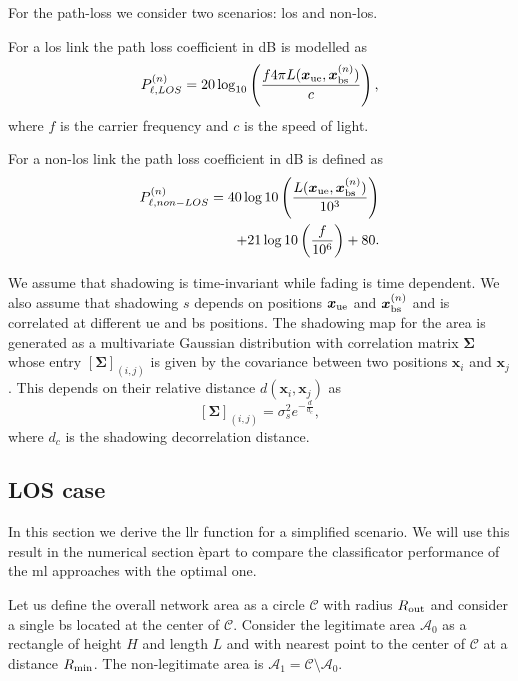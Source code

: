 \documentclass[twocolumns]{IEEEtran}
\begin{document}
For the path-loss we consider two scenarios: \ac{los} and non-\ac{los}.

For a \ac{los} link the path loss coefficient in dB is modelled as
\begin{equation}\label{eq:los}
    P_{\ell,LOS}^{(n)} = 20\log_{10}\left(\frac{f 4\pi L(\bm{x}_{\rm ue},\bm{x}_{\rm bs}^{(n)})}{c}\right),
\end{equation}
where $f$ is the carrier frequency and $c$ is the speed of light.

For a  non-\ac{los} link the path loss coefficient in dB is defined as
\begin{equation}
\begin{split}
    P_{\ell, non-LOS}^{(n)} = 40\log10\left (\frac{L(\bm{x}_{\rm ue},\bm{x}_{\rm bs}^{(n)})}{10^3}\right ) \\
    + 21\log10\left(\frac{f}{10^6}\right) + 80.
    \end{split}
\end{equation}

We assume that shadowing is time-invariant while fading is time dependent. We also assume that shadowing $s$ depends on positions $\bm{x}_{\rm ue}$ and $\bm{x}_{\rm bs}^{(n)}$ and is correlated at different \ac{ue} and \ac{bs} positions. The shadowing map for the area is generated as a multivariate Gaussian distribution with correlation matrix $\bm{\Sigma}$ whose entry $\left[\bm{\Sigma}\right]_{(i,j)}$ is given by the covariance between two positions $\bm{x}_i$ and $\bm{x}_j$. This depends on their relative distance $d(\bm{x}_i,\bm{x}_j)$ as
\begin{equation}\label{eq: coor mat}
    \left[\bm{\Sigma}\right]_{(i,j)} = \sigma_s^2e^{-\frac{d}{d_c}},
\end{equation}
where $d_c$ is the shadowing decorrelation distance. 

\subsection{LOS case}

In this section we derive the \ac{llr} function for a simplified scenario. We will use this result in the numerical section èpart to compare the classificator performance of the \ac{ml} approaches with the optimal one.

Let us define the overall network area as a circle $\mathcal{C}$ with radius $R_{\rm out}$ and consider a single \ac{bs} located at the center of $\mathcal{C}$. Consider the legitimate area $\mathcal{A}_{0}$ as a rectangle of height $H$ and length $L$ and with nearest point to the center of $\mathcal{C}$ at a distance $R_{\rm min}$. The non-legitimate area is $\mathcal{A}_1 = \mathcal{C} \setminus \mathcal{A}_0$.
\end{document}
